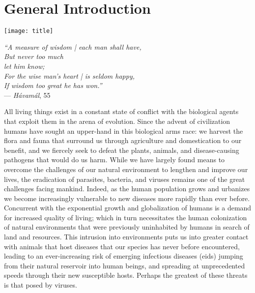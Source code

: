 \chapter{General Introduction}\label{ch:introduction}

\begin{minipage}[b]{0.6\textwidth}
  \texttt{[image: title]} %
\end{minipage}
\hfill
\begin{minipage}[b]{0.35\textwidth}
  \begin{flushright}
    \footnotesize
    \textit{``A measure of wisdom | each man shall have,\\
    But never too much\\let him know;\\
    For the wise man's heart | is seldom happy,\\
    If wisdom too great he has won.''} \\
    --- \textit{H\'avam\'al}, 55 
  \end{flushright}
  \vspace{2cm}
\end{minipage}

\clearpage

\onehalfspacing

All living things exist in a constant state of conflict with the biological agents that exploit them in the arena of evolution.
Since the advent of civilization humans have sought an upper-hand in this biological arms race: we harvest the flora and fauna that surround us through agriculture and domestication to our benefit, and we fiercely seek to defeat the plants, animals, and disease-causing pathogens that would do us harm.
While we have largely found means to overcome the challenges of our natural environment to lengthen and improve our lives, the eradication of parasites, bacteria, and viruses remains one of the great challenges facing mankind.
Indeed, as the human population grows and urbanizes we become increasingly vulnerable to new diseases more rapidly than ever before.
Concurrent with the exponential growth and globalization of humans is a demand for increased quality of living; which in turn necessitates the human colonization of natural environments that were previously uninhabited by humans in search of land and resources.
This intrusion into environments puts us into greater contact with animals that host diseases that our species has never before encountered, leading to an ever-increasing risk of emerging infectious diseases (\gls{eid}s) \citep{Morens2020} jumping from their natural reservoir into human beings, and spreading at unprecedented speeds through their new susceptible hosts.
Perhaps the greatest of these threats is that posed by viruses.

